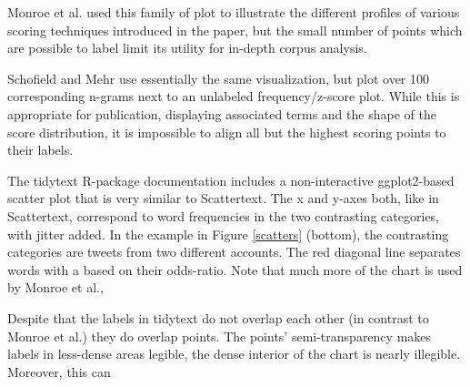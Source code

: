 \documentclass[11pt,a4paper]{article}
\begin{document}
Monroe et al.  used this family of plot to illustrate the different profiles of various scoring techniques introduced in the paper, but the small number of points which are possible to label limit its utility for in-depth corpus analysis.  

Schofield and Mehr  use essentially the same visualization, but plot over 100 corresponding n-grams next to an unlabeled frequency/z-score plot.  While this is appropriate for publication, displaying associated terms and the shape of the score distribution, it is impossible to align all but the highest scoring points to their labels. 

The tidytext R-package \cite{tidytext} documentation includes a non-interactive ggplot2-based \cite{ggplot2} scatter plot that is very similar to Scattertext.   The x and y-axes both, like in Scattertext, correspond to word frequencies in the two contrasting categories, with jitter added.   In the example in Figure \ref{scatters} (bottom), the contrasting categories are tweets from two different accounts.  The red diagonal line separates words with a based on their odds-ratio.  Note that much more of the chart is used by Monroe et al., 

Despite that the labels in tidytext do not overlap each other (in contrast to Monroe et al.) they do overlap points.  The points' semi-transparency makes labels in less-dense areas legible, the dense interior of the chart is nearly illegible.  Moreover, this can 
\end{document}
